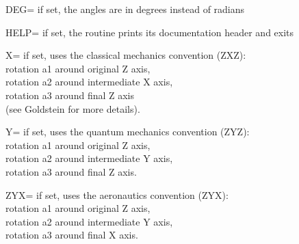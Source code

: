 \begin{keywords}
  \begin{kwlist}{} %
    \item[DEG=]  
      if set, the angles are in degrees instead of radians

    \item[HELP=]  
      if set, the routine prints its documentation header and exits

    \item[X=]  
      if set, uses the classical mechanics convention (ZXZ):\\
	rotation a1 around original Z axis, \\
	rotation a2 around intermediate X axis, \\
        rotation a3 around final Z axis \\
        (see Goldstein for more details). \\

    \item[Y=]  
      if set, uses the quantum mechanics convention (ZYZ):\\
	rotation a1 around original Z axis, \\
	rotation a2 around intermediate Y axis, \\
        rotation a3 around final Z axis.

    \item[ZYX=]  
      if set, uses the aeronautics convention (ZYX):\\
	rotation a1 around original Z axis, \\
	rotation a2 around intermediate Y axis, \\
        rotation a3 around final X axis.
  \end{kwlist}
\end{keywords}  

